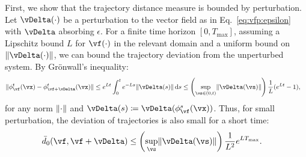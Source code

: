 \documentclass{article}
\theoremstyle{definition} \newtheorem{definition}{Definition}  \newtheorem{example}{Example}
\theoremstyle{remark} \newtheorem{remark}{Remark}
\newcounter{ct}
\DeclarePairedDelimiter{\norm}{\lVert}{\rVert}
\begin{document}
First, we show that the trajectory distance measure is bounded by perturbation. %
Let $\vDelta(\cdot)$ be a perturbation to the vector field as in Eq.~\ref{eq:vfp:epsilon} with $\vDelta$ absorbing $\epsilon$.
For a finite time horizon $[0, T_\text{max}]$, assuming a Lipschitz bound $L$ for $\vf(\cdot)$ in the relevant domain and a uniform bound on $\norm{\vDelta(\cdot)}$, we can bound the trajectory deviation from the unperturbed system.
By Gr\"onwall's inequality\cite{Howard2025}:
\begin{align}\label{eq:gronwall}
    \norm{
	\phi^t_\vf(\vx)
	-
	\phi^t_{\vf + \vDelta}(\vx)
    }
    &\leq
	e^{Lt} \int_0^{t} e^{-Ls} \norm{\vDelta(s)} \,\mathrm{d}s
    \leq
    \left(\sup_{\vs \in (0, t)} \norm{\vDelta(\vs)}\right) \frac{1}{L} (e^{Lt} - 1),
\end{align}
for any norm $\norm{\cdot}$ and $\vDelta(s) \coloneq \vDelta(\phi^s_\vf(\vx))$.
Thus, for small perturbation, the deviation of trajectories is also small for a short time:
\begin{align}\label{eq:d0bound}
    \bar{d}_0(\vf, \vf + \vDelta)
    &\leq
    \left(\sup_\vs \norm{\vDelta(\vs)}\right) \frac{1}{L^2} e^{LT_{\text{max}}}.
\end{align}
\end{document}
